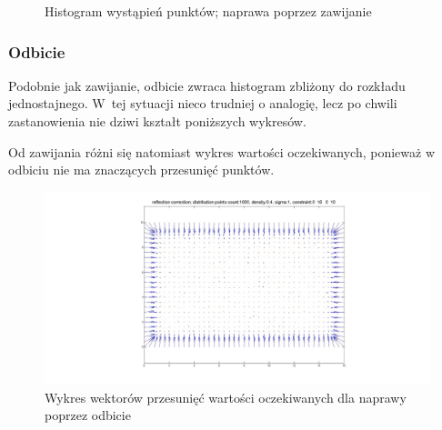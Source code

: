 \documentclass{mini}
\begin{document}
\begin{figure}[H]
\centering
{}
\quad
{}
\caption{Histogram wystąpień punktów; naprawa poprzez zawijanie}
\end{figure}

\subsubsection*{Odbicie}
\hspace{3,4ex}Podobnie jak zawijanie, odbicie zwraca histogram zbliżony do rozkładu jednostajnego. W~tej sytuacji nieco trudniej o analogię, lecz po chwili zastanowienia nie dziwi kształt poniższych wykresów.

Od zawijania różni się natomiast wykres wartości oczekiwanych, ponieważ w odbiciu nie ma znaczących przesunięć punktów.

\begin{figure}[H]
\centering
\includegraphics[width=\textwidth]{reflection2dprzesuniecie}
\caption{Wykres wektorów przesunięć wartości oczekiwanych dla naprawy poprzez odbicie}
\end{figure}
\end{document}
